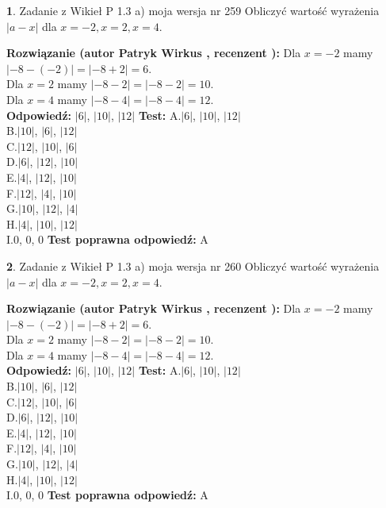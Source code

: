 \documentclass[12pt, a4paper]{article}
\theoremstyle{definition} %
\newtheorem{zad}{}
\newcommand{\zadStart}[1]{\begin{zad}#1\newline}
\newcommand{\zadStop}{\end{zad}}
\newcommand{\rozwStart}[2]{\noindent \textbf{Rozwiązanie (autor #1 , recenzent #2): }\newline}
\newcommand{\rozwStop}{\newline}
\newcommand{\odpStart}{\noindent \textbf{Odpowiedź:}\newline}
\newcommand{\odpStop}{\newline}
\newcommand{\testStart}{\noindent \textbf{Test:}\newline}
\newcommand{\testStop}{\newline}
\newcommand{\kluczStart}{\noindent \textbf{Test poprawna odpowiedź:}\newline}
\newcommand{\kluczStop}{\newline}
\begin{document}
\zadStart{Zadanie z Wikieł P 1.3 a) moja wersja nr 259}
Obliczyć wartość wyrażenia $|a - x|$ dla $x=-2,x=2,x=4$.
\zadStop
\rozwStart{Patryk Wirkus}{}
Dla $x = -2$ mamy $|-8 - (-2)| = |-8 + 2| = 6$.\\
Dla $x = 2$ mamy $|-8 - 2| = |-8 - 2| = 10$.\\
Dla $x = 4$ mamy $|-8 - 4| = |-8 - 4| = 12$.\\
\rozwStop
\odpStart
$|6|$, $|10|$, $|12|$
\odpStop
\testStart
A.$|6|$, $|10|$, $|12|$\\
B.$|10|$, $|6|$, $|12|$\\
C.$|12|$, $|10|$, $|6|$\\
D.$|6|$, $|12|$, $|10|$\\
E.$|4|$, $|12|$, $|10|$\\
F.$|12|$, $|4|$, $|10|$\\
G.$|10|$, $|12|$, $|4|$\\
H.$|4|$, $|10|$, $|12|$\\
I.$0$, $0$, $0$
\testStop
\kluczStart
A
\kluczStop



\zadStart{Zadanie z Wikieł P 1.3 a) moja wersja nr 260}
Obliczyć wartość wyrażenia $|a - x|$ dla $x=-2,x=2,x=4$.
\zadStop
\rozwStart{Patryk Wirkus}{}
Dla $x = -2$ mamy $|-8 - (-2)| = |-8 + 2| = 6$.\\
Dla $x = 2$ mamy $|-8 - 2| = |-8 - 2| = 10$.\\
Dla $x = 4$ mamy $|-8 - 4| = |-8 - 4| = 12$.\\
\rozwStop
\odpStart
$|6|$, $|10|$, $|12|$
\odpStop
\testStart
A.$|6|$, $|10|$, $|12|$\\
B.$|10|$, $|6|$, $|12|$\\
C.$|12|$, $|10|$, $|6|$\\
D.$|6|$, $|12|$, $|10|$\\
E.$|4|$, $|12|$, $|10|$\\
F.$|12|$, $|4|$, $|10|$\\
G.$|10|$, $|12|$, $|4|$\\
H.$|4|$, $|10|$, $|12|$\\
I.$0$, $0$, $0$
\testStop
\kluczStart
A
\kluczStop
\end{document}

